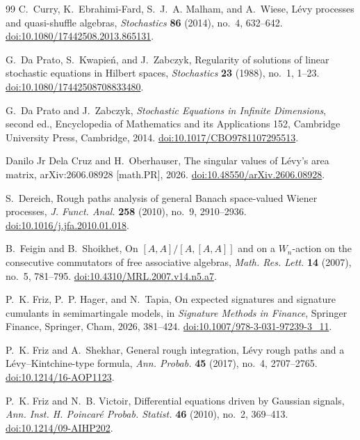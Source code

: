 \documentclass[10pt,reqno]{amsart}
\theoremstyle{plain}
\theoremstyle{definition}
\theoremstyle{remark}
\begin{document}
\begin{thebibliography}{99}
C.~Curry, K.~Ebrahimi-Fard, S.~J.~A. Malham, and A.~Wiese,
L\'evy processes and quasi-shuffle algebras,
\emph{Stochastics} \textbf{86} (2014), no.~4, 632--642.
\href{https://doi.org/10.1080/17442508.2013.865131}
{doi:10.1080/17442508.2013.865131}.

G.~Da Prato, S.~Kwapie\'n, and J.~Zabczyk,
Regularity of solutions of linear stochastic equations in Hilbert spaces,
\emph{Stochastics} \textbf{23} (1988), no.~1, 1--23.
\href{https://doi.org/10.1080/17442508708833480}
{doi:10.1080/17442508708833480}.

G.~Da Prato and J.~Zabczyk,
\emph{Stochastic Equations in Infinite Dimensions}, second ed.,
Encyclopedia of Mathematics and its Applications 152,
Cambridge University Press, Cambridge, 2014.
\href{https://doi.org/10.1017/CBO9781107295513}
{doi:10.1017/CBO9781107295513}.

Danilo Jr Dela Cruz and H.~Oberhauser,
The singular values of L\'evy's area matrix,
arXiv:2606.08928 [math.PR], 2026.
\href{https://doi.org/10.48550/arXiv.2606.08928}
{doi:10.48550/arXiv.2606.08928}.

S.~Dereich,
Rough paths analysis of general Banach space-valued Wiener processes,
\emph{J. Funct. Anal.} \textbf{258} (2010), no.~9, 2910--2936.
\href{https://doi.org/10.1016/j.jfa.2010.01.018}
{doi:10.1016/j.jfa.2010.01.018}.

B.~Feigin and B.~Shoikhet,
On \([A,A]/[A,[A,A]]\) and on a \(W_n\)-action on the consecutive
commutators of free associative algebras,
\emph{Math. Res. Lett.} \textbf{14} (2007), no.~5, 781--795.
\href{https://doi.org/10.4310/MRL.2007.v14.n5.a7}
{doi:10.4310/MRL.2007.v14.n5.a7}.

P.~K. Friz, P.~P. Hager, and N.~Tapia,
On expected signatures and signature cumulants in semimartingale models,
in \emph{Signature Methods in Finance}, Springer Finance,
Springer, Cham, 2026, 381--424.
\href{https://doi.org/10.1007/978-3-031-97239-3_11}
{doi:10.1007/978-3-031-97239-3\_11}.

P.~K. Friz and A.~Shekhar,
General rough integration, L\'evy rough paths and a L\'evy--Kintchine-type formula,
\emph{Ann. Probab.} \textbf{45} (2017), no.~4, 2707--2765.
\href{https://doi.org/10.1214/16-AOP1123}
{doi:10.1214/16-AOP1123}.

P.~K. Friz and N.~B. Victoir,
Differential equations driven by Gaussian signals,
\emph{Ann. Inst. H. Poincar\'e Probab. Statist.} \textbf{46} (2010),
no.~2, 369--413.
\href{https://doi.org/10.1214/09-AIHP202}
{doi:10.1214/09-AIHP202}.


\end{thebibliography}
\end{document}
